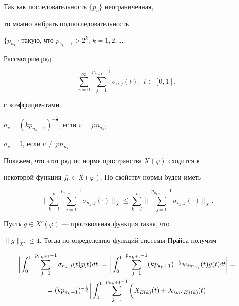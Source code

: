 \begin{pf}


Так как последовательность $\{p_{n}\}$ неограниченная, 


то можно выбрать подпоследовательность


$\{p_{n_{k}}\}$ такую, что $p_{n_{k}+1}>2^{k}$, $k=1,2,\dotsc$


Рассмотрим ряд


$$


\sum_{n=0}^{\infty} \sum_{j=1}^{p_{n+1}-1}\sigma_{n,j}(t),\ \ t\in[0,1],


$$


с коэффициентами


$a_{v}=(k p_{n_{k}+1})^{-\frac{1}{2}}$, если $v=j m_{n_{k}}$,


$a_{v}=0$, если $v\neq j m_{n_{k}}$.


Покажем, что этот ряд по норме пространства $X(\varphi)$ сходится к 


некоторой функции $f_{0}\in X(\varphi)$. По свойству нормы будем иметь


\begin{equation}


\bigg\|\sum_{k=l}^{v} \sum_{j=1}^{p_{n_{k}+1}-1}\sigma_{n_{k},j}(\cdot) 


\bigg\|_{X}\leq\sum_{k=l}^{v} 


\bigg\|\sum_{j=1}^{p_{n_{k}+1}-1}\sigma_{n_{k},j}(\cdot) \bigg\|_{X}.


\end{equation}





Пусть $g\in X'(\overline{\varphi})$ --- произвольная функция такая, что 


$\|g\|_{X'}\leq 1$. Тогда по определению функций системы Прайса получим


\begin{multline}


\bigg|\int_{0}^{1}\ \sum_{j=1}^{p_{n_{k}+1}-1}


\sigma_{n_{k},j}(t)g(t)dt\bigg|=


\bigg|\int_{0}^{1}\ \sum_{j=1}^{p_{n_{k}+1}-1}(k p_{n_{k}+1})^{-\frac{1}{2}} 


\psi_{j m_{n_{k}}}(t)g(t)dt\bigg|= \\


%


=(k p_{n_{k}+1})^{-\frac{1}{2}}\bigg|\int_{0}^{1}


\ \sum_{j=1}^{p_{n_{k}+1}-1}\bigg(X_{E(k)}(t)+X_{\ov{E}(k)}(t)



\end{multline}
\end{pf}
